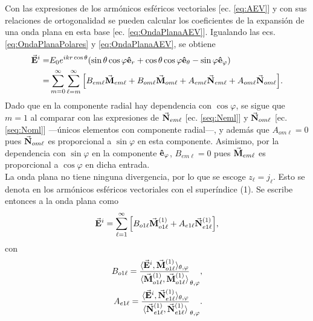 Con las expresiones de los armónicos esféricos vectoriales  [ec. \eqref{eq:AEV}] y con sus relaciones de ortogonalidad se pueden calcular los coeficientes de la expansión de una onda plana en esta base [ec. \eqref{eq:OndaPlanaAEV}]. Igualando las ecs. \eqref{eq:OndaPlanaPolares} y \eqref{eq:OndaPlanaAEV}, se obtiene
	\begin{align*}
\va{E}^i = & E_0 e^{ikr\cos\theta} \qty(\sin\theta\cos\varphi \vu{e}_r + 
								\cos\theta\cos\varphi\vu{e}_\theta-\sin\varphi\vu{e}_\varphi)\\
	 =& \sum_{m=0}^\infty\sum_{\ell=m}^\infty \qty[ B_{em\ell}\va{M}_{em\ell} 
	 	+ B_{om\ell}\va{M}_{om\ell} +A_{em\ell}\va{N}_{em\ell} + A_{om\ell}\va{N}_{om\ell}].
	\end{align*}
Dado que en la componente radial hay dependencia con $\cos\varphi$, se sigue que $m=1$ al comparar con las expresiones de $\va{N}_{em\ell}$ [ec. \eqref{seq:Neml}] y $\va{N}_{om\ell}$ [ec. \eqref{seq:Noml}] ---únicos elementos con componente radial---, y además que $A_{om\ell}=0$ pues $\va{N}_{om\ell}$ es proporcional a $\sin\varphi$ en esta componente. Asimismo, por la dependencia con $\sin\varphi$ en la componente  $\vu{e}_\varphi$, $B_{em\ell}=0$ pues $\va{M}_{em\ell}$ es proporcional a $\cos\varphi$ en dicha entrada. \\

La onda plana no tiene ninguna divergencia, por lo que se escoge $z_\ell = j_\ell$. Esto se denota en los armónicos esféricos vectoriales con el superíndice (1). Se escribe entonces a la onda plana como
	\begin{equation}
	\va{E}^i = \sum_{\ell=1}^\infty \qty[B_{o1\ell}\va{M}_{o1\ell}^{(1)} + A_{e1\ell}\va{N}_{e1\ell}^{(1)}],
	\end{equation}
con\\

	\begin{align}
	B_{o1\ell} = \frac{\langle \va{E}^i, \va{M}_{o1\ell}^{(1)}  \rangle_{\theta,\varphi}}
						{\langle \va{M}_{o1\ell}^{(1)} ,\va{M}_{o1\ell}^{(1)} \rangle}_{\theta,\varphi},\notag\\
	A_{e1\ell} = \frac{\langle \va{E}^i, \va{N}_{e1\ell}^{(1)} \rangle_{\theta,\varphi}}
						{\langle \va{N}_{e1\ell}^{(1)},\va{N}_{e1\ell}^{(1)} \rangle}_{\theta,\varphi}						.
	\end{align}

